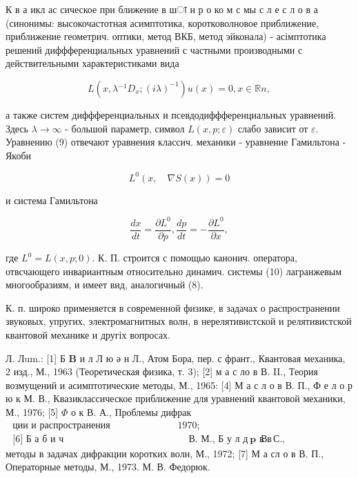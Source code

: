 \documentclass[10pt]{article}
\begin{document}
К в а икл ас сическое при ближение в шा и р о ко м с мы с л е с л о в а (синонимы: высокочастотная асимптотика, коротковолновое приближение, приближение геометрич. оптики, метод ВКБ, метод эйконала) - асімптотика решений диффференциальных уравнений с частными производными с действительными характеристиками вида



\[

L\left(x, \lambda{ }^{-1} D_{x} ;(i \lambda)^{-1}\right) u(x)=0, x \in \mathbb{R} n,

\]



а также систем диффференциальных и псевдодиффференциальных уравнений. Здесь $\lambda \rightarrow \infty$ - большой параметр, символ $L(x, p ; \varepsilon)$ слабо зависит от $\varepsilon$. Уравнению (9) отвечают уравнения классич. механики - уравнение Гамильтона - Якоби



\[

L^{0}(x, \quad \nabla S(x))=0

\]



и система Гамильтона



\[

\frac{d x}{d t}=\frac{\partial L^{0}}{\partial p}, \frac{d p}{d t}=-\frac{\partial L^{0}}{\partial x},

\]



где $L^{0}=L(x, p ; 0)$. К. П. строится с помощью канонич. оператора, отвсчающего инвариантным относительно динамич. системы (10) лагранжевым многообразиям, и имеет вид, аналогичный (8).



К. п. широко применяется в современной физике, в задачах о распространении звуковых, упругих, электромагнитных волн, в нерелятивистской и релятивистской квантовой механике и другіх вопросах.



Л. Лum.: [1] Б $\mathbf{B}$ и л Л ю ә н Л., Атом Бора, пер. с франт., Квантовая механика, 2 изд., М., 1963 (Теоретическая физика, т. 3); [2] м а с ло в В. II., Теория возмущений и асимптотические методы, М., 1965: [4] М а с л о в В. П., Ф е л о р ю к М. В., Квазиклассическое приближение для уравнений квантовой механики, М., 1976; [5] $\Phi$ о к В. А., Проблемы дифрак$\begin{array}{llll}\text { ции и распространения электромагнитных волн, М., } 1970 ; \\ \text { [6] Б а б и ч } & \text { В. М., Б у л д ы } \mathbf{p} \text { в в } & \text { В. С., Асимптотические }\end{array}$ методы в задачах дифракции коротких волн, М., 1972; [7] М а сл о в В. П., Операторные методы, М., 1973. М. В. Федорюк.
\end{document}
